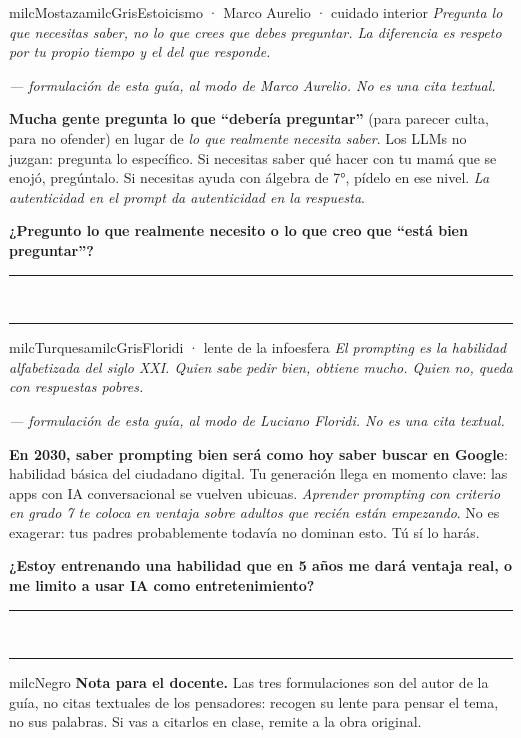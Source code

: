 \documentclass[11pt,letterpaper]{article}
\newcommand{\linead}[1]{\noindent\color{milcLinea}\rule{#1}{0.5pt}\color{milcNegro}}
\begin{document}
\begin{softbox}{milcMostaza}{milcGris}{Estoicismo · Marco Aurelio · cuidado interior}
\textit{Pregunta lo que necesitas saber, no lo que crees que debes preguntar. La diferencia es respeto por tu propio tiempo y el del que responde.}

{\footnotesize\itshape\color{milcNegro!70}--- formulación de esta guía, al modo de Marco Aurelio. No es una cita textual.}

\textbf{Mucha gente pregunta lo que ``debería preguntar''} (para parecer culta, para no ofender) en lugar de \emph{lo que realmente necesita saber}. Los LLMs no juzgan: pregunta lo específico. Si necesitas saber qué hacer con tu mamá que se enojó, pregúntalo. Si necesitas ayuda con álgebra de 7°, pídelo en ese nivel. \emph{La autenticidad en el prompt da autenticidad en la respuesta}.

\textbf{¿Pregunto lo que realmente necesito o lo que creo que ``está bien preguntar''?}
\end{softbox}
\linead{\linewidth}\\[1mm]
\linead{\linewidth}

\begin{softbox}{milcTurquesa}{milcGris}{Floridi · lente de la infoesfera}
\textit{El prompting es la habilidad alfabetizada del siglo XXI. Quien sabe pedir bien, obtiene mucho. Quien no, queda con respuestas pobres.}

{\footnotesize\itshape\color{milcNegro!70}--- formulación de esta guía, al modo de Luciano Floridi. No es una cita textual.}

\textbf{En 2030, saber prompting bien será como hoy saber buscar en Google}: habilidad básica del ciudadano digital. Tu generación llega en momento clave: las apps con IA conversacional se vuelven ubicuas. \emph{Aprender prompting con criterio en grado 7 te coloca en ventaja sobre adultos que recién están empezando}. No es exagerar: tus padres probablemente todavía no dominan esto. Tú sí lo harás.

\textbf{¿Estoy entrenando una habilidad que en 5 años me dará ventaja real, o me limito a usar IA como entretenimiento?}
\end{softbox}
\linead{\linewidth}\\[1mm]
\linead{\linewidth}

\begin{infoband}{milcNegro}
\textbf{Nota para el docente.} Las tres formulaciones son del autor de la guía, no citas textuales de los pensadores: recogen su lente para pensar el tema, no sus palabras. Si vas a citarlos en clase, remite a la obra original.
\end{infoband}
\end{document}
